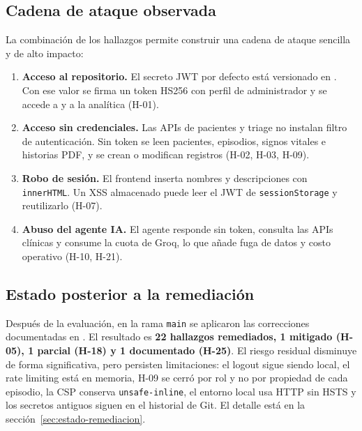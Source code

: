 \subsection{Cadena de ataque observada}

La combinación de los hallazgos permite construir una cadena de ataque sencilla
y de alto impacto:

\begin{enumerate}
  \item \textbf{Acceso al repositorio.} El secreto JWT por defecto está versionado
  en . Con ese valor se firma un token HS256 con
  perfil de administrador y se accede a  y a la
  analítica (H-01).
  \item \textbf{Acceso sin credenciales.} Las APIs de pacientes y triage no
  instalan filtro de autenticación. Sin token se leen pacientes, episodios,
  signos vitales e historias PDF, y se crean o modifican registros (H-02, H-03,
  H-09).
  \item \textbf{Robo de sesión.} El frontend inserta nombres y descripciones con
  \texttt{innerHTML}. Un XSS almacenado puede leer el JWT de
  \texttt{sessionStorage} y reutilizarlo (H-07).
  \item \textbf{Abuso del agente IA.} El agente responde sin token, consulta las
  APIs clínicas y consume la cuota de Groq, lo que añade fuga de datos y costo
  operativo (H-10, H-21).
\end{enumerate}


\subsection{Estado posterior a la remediación}

Después de la evaluación, en la rama \texttt{main} se aplicaron las correcciones
documentadas en . El resultado es
\textbf{22 hallazgos remediados, 1 mitigado (H-05), 1 parcial (H-18) y 1 documentado
(H-25)}. El riesgo residual disminuye de forma significativa, pero persisten
limitaciones: el logout sigue siendo local, el rate limiting está en memoria, H-09
se cerró por rol y no por propiedad de cada episodio, la CSP conserva
\texttt{unsafe-inline}, el entorno local usa HTTP sin HSTS y los secretos antiguos
siguen en el historial de Git. El detalle está en la sección~\ref{sec:estado-remediacion}.

